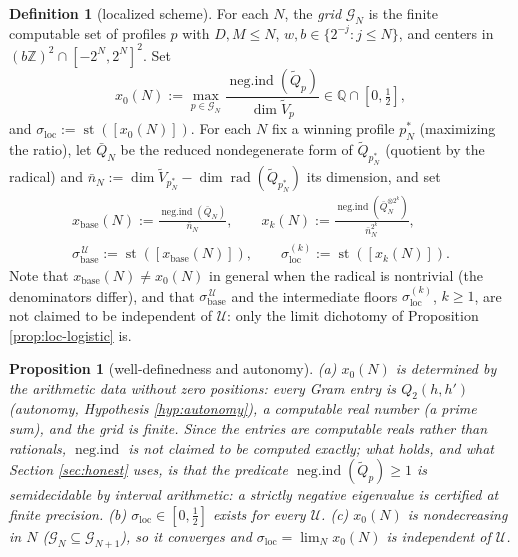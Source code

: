 \documentclass[11pt,reqno]{amsart}
\newtheorem{proposition}[theorem]{Proposition}
\theoremstyle{definition}
\newtheorem{definition}[theorem]{Definition}
\newcommand{\negind}{\operatorname{neg.ind}}
\newcommand{\Z}{\mathbb{Z}}
\newcommand{\sst}{\operatorname{st}}
\begin{document}
\begin{definition}[localized scheme]\label{def:loc-scheme}
For each \(N\), the \emph{grid} \(\mathcal G_N\) is the finite computable set of
profiles \(p\) with \(D,M\leq N\), \(w,b\in\{2^{-j}:j\leq N\}\), and centers in
\((b\Z)^2\cap[-2^N,2^N]^2\). Set
\[
x_0(N):=\max_{p\in\mathcal G_N}\frac{\negind(\tilde Q_p)}{\dim\tilde V_p}
\in\mathbb Q\cap[0,\tfrac12],
\]
and \(\sigma_{\mathrm{loc}}:=\sst([x_0(N)])\). For each \(N\) fix a winning
profile \(p^*_N\) (maximizing the ratio), let \(\bar Q_N\) be the reduced
nondegenerate form of \(\tilde Q_{p^*_N}\) (quotient by the radical) and
\(\bar n_N:=\dim\tilde V_{p^*_N}-\dim\operatorname{rad}(\tilde Q_{p^*_N})\) its
dimension, and set
\[
\begin{gathered}
x_{\mathrm{base}}(N):=\frac{\negind(\bar Q_N)}{\bar n_N},\qquad
x_k(N):=\frac{\negind(\bar Q_N^{\otimes2^k})}{\bar n_N^{2^k}},\\[2pt]
\sigma_{\mathrm{base}}^{\,\mathcal U}:=\sst([x_{\mathrm{base}}(N)]),\qquad
\sigma_{\mathrm{loc}}^{(k)}:=\sst([x_k(N)]).
\end{gathered}
\]
Note that \(x_{\mathrm{base}}(N)\neq x_0(N)\) in general when the radical is
nontrivial (the denominators differ), and that
\(\sigma_{\mathrm{base}}^{\,\mathcal U}\) and the intermediate floors
\(\sigma_{\mathrm{loc}}^{(k)}\), \(k\geq1\), are not claimed to be independent
of \(\mathcal U\): only the limit dichotomy of Proposition
\ref{prop:loc-logistic} is.
\end{definition}

\begin{proposition}[well-definedness and autonomy]\label{prop:loc-welldef}
\textup{(a)} \(x_0(N)\) is determined by the arithmetic data without zero
positions: every Gram entry is \(Q_2(h,h')\) (autonomy, Hypothesis
\ref{hyp:autonomy}), a computable real number (a prime sum), and the grid is
finite. Since the entries are computable reals rather than rationals,
\(\negind\) is \emph{not} claimed to be computed exactly; what holds, and what
Section \ref{sec:honest} uses, is that the predicate
\(\negind(\tilde Q_p)\geq1\) is \emph{semidecidable} by interval arithmetic: a
strictly negative eigenvalue is certified at finite precision. \textup{(b)}
\(\sigma_{\mathrm{loc}}\in[0,\tfrac12]\) exists for every \(\mathcal U\).
\textup{(c)} \(x_0(N)\) is nondecreasing in \(N\) (\(\mathcal G_N\subseteq
\mathcal G_{N+1}\)), so it converges and \(\sigma_{\mathrm{loc}}=\lim_N x_0(N)\)
is independent of \(\mathcal U\).
\end{proposition}
\end{document}
